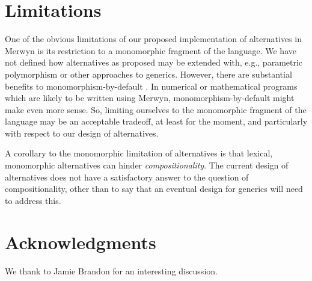 \documentclass{article}
\renewcommand{\=}{\triangleq}
\begin{document}
\section{Limitations}

One of the obvious limitations of
our proposed implementation of alternatives in Merwyn is its restriction to
a monomorphic fragment of the language.
We have not defined how alternatives as proposed may be extended with,
e.g., parametric polymorphism or other approaches to generics.
However, there are substantial benefits to monomorphism-by-default
\cite{vytiniotis10}.
In numerical or mathematical programs which are likely to be written using
Merwyn,
monomorphism-by-default might make even more sense.
So, limiting ourselves to the monomorphic fragment of the language may be
an acceptable tradeoff, at least for the moment,
and particularly with respect to our design of alternatives.

A corollary to the monomorphic limitation of alternatives is that
lexical, monomorphic alternatives can hinder \emph{compositionality}.
The current design of alternatives does not have a satisfactory answer to
the question of compositionality, other than to say that an eventual design
for generics will need to address this.

\section*{Acknowledgments}

We thank to Jamie Brandon for an interesting discussion.



\end{document}

